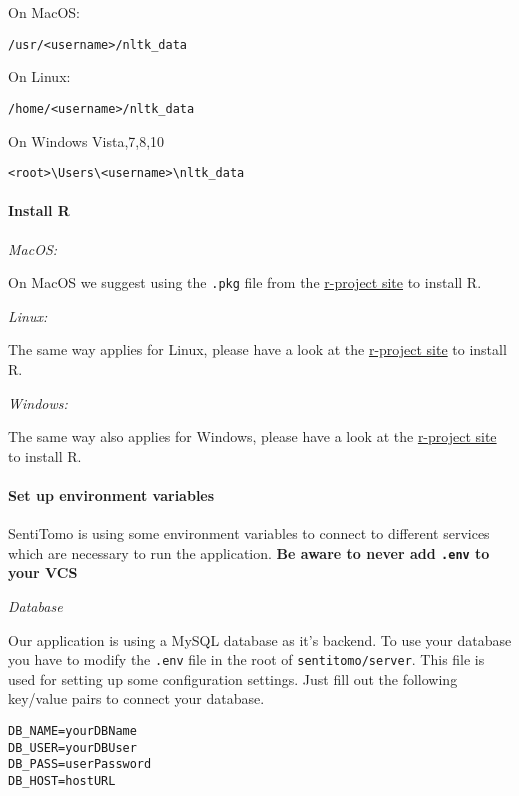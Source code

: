 \documentclass[]{article}
\let\oldparagraph\paragraph
\renewcommand{\paragraph}[1]{\oldparagraph{#1}\mbox{}}
\begin{document}
On MacOS:

\begin{verbatim}
/usr/<username>/nltk_data
\end{verbatim}

On Linux:

\begin{verbatim}
/home/<username>/nltk_data
\end{verbatim}

On Windows Vista,7,8,10

\begin{verbatim}
<root>\Users\<username>\nltk_data
\end{verbatim}

\paragraph{Install R}\label{install-r}

\emph{MacOS:}

On MacOS we suggest using the \texttt{.pkg} file from the
\href{https://cran.r-project.org/bin/macosx/}{r-project site} to install
R.

\emph{Linux:}

The same way applies for Linux, please have a look at the
\href{https://cran.r-project.org/bin/macosx/}{r-project site} to install
R.

\emph{Windows:}

The same way also applies for Windows, please have a look at the
\href{https://cran.r-project.org/bin/macosx/}{r-project site} to install
R.

\paragraph{Set up environment
variables}\label{set-up-environment-variables}

SentiTomo is using some environment variables to connect to different
services which are necessary to run the application. \textbf{Be aware to
never add \texttt{.env} to your VCS}

\emph{Database}

Our application is using a MySQL database as it's backend. To use your
database you have to modify the \texttt{.env} file in the root of
\texttt{sentitomo/server}. This file is used for setting up some
configuration settings. Just fill out the following key/value pairs to
connect your database.

\begin{verbatim}
DB_NAME=yourDBName
DB_USER=yourDBUser
DB_PASS=userPassword
DB_HOST=hostURL
\end{verbatim}
\end{document}
